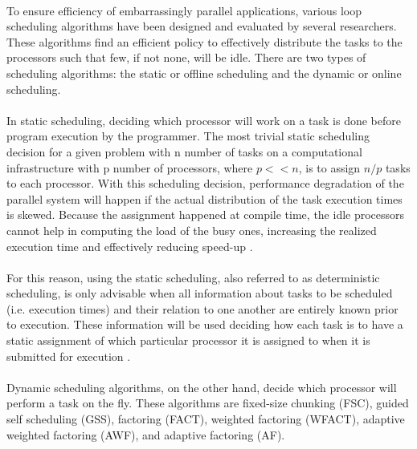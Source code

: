\documentclass[10pt, twocolumn, letterpaper]{article}
\begin{document}
\paragraph{}
To ensure efficiency of embarrassingly parallel applications, various loop scheduling algorithms have been designed and evaluated by several researchers. These algorithms find an efficient policy to effectively distribute the tasks to the processors such that few, if not none, will be idle. There are two types of scheduling algorithms: the static or offline scheduling and the dynamic or online scheduling.

\paragraph{}
In static scheduling, deciding which processor will work on a task is done before program execution by the programmer. The most trivial static scheduling decision for a given problem with n number of tasks on a computational infrastructure with p number of processors, where $p<<n$, is to assign $n/p$ tasks to each processor. With this scheduling decision, performance degradation of the parallel system will happen if the actual distribution of the task execution times is skewed. Because the assignment happened at compile time, the idle processors cannot help in computing the load of the busy ones, increasing the realized execution time and effectively reducing speed-up \cite{pabico}.

\paragraph{}
For this reason, using the static scheduling, also referred to as deterministic scheduling, is only advisable when all information about tasks to be scheduled (i.e. execution times) and their relation to one another are entirely known prior to execution. These information will be used deciding how each task is to have a static assignment of which particular processor it is assigned to when it is submitted for execution \cite{el-rewini}.

\paragraph{}
Dynamic scheduling algorithms, on the other hand, decide which processor will perform a task on the fly. These algorithms are fixed-size chunking (FSC), guided self scheduling (GSS), factoring (FACT), weighted factoring (WFACT), adaptive weighted factoring (AWF), and adaptive factoring (AF).
\end{document}
